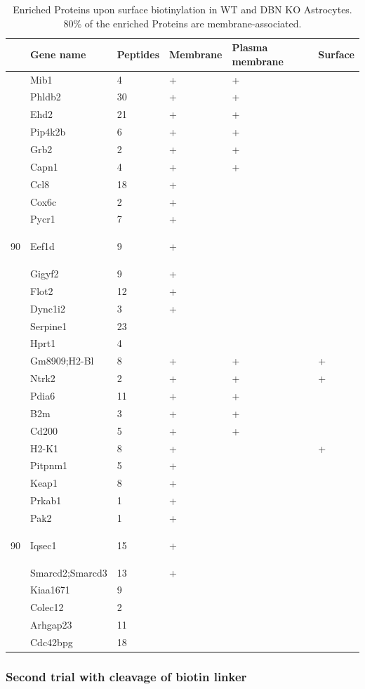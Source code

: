 \documentclass[a4paper,11pt,bibtotocnumbered]{article}
\newcommand\tabrotate[1]{\begin{turn}{90}\rlap{#1}\end{turn}} %
\begin{document}
\begin{table}[H]
\centering
\caption[Enriched Proteins upon surface biotinylation.]{Enriched Proteins upon surface biotinylation in WT and DBN KO Astrocytes. 80\% of the enriched Proteins are membrane-associated.}\label{Biotintable1}
\renewcommand{\arraystretch}{.8}
\begin{tabularx}{\textwidth}{p{.5cm}p{3cm}XXXX}
\toprule
&Gene name& Peptides & Membrane & Plasma membrane& Surface\\ 
\midrule
&Mib1&4&+&+&\\
&Phldb2 &30&+&+&\\
&Ehd2& 21&+&+&\\
&Pip4k2b&6&+&+&\\
&Grb2&2&+&+&\\
&Capn1&4&+&+&\\
&Ccl8&18&+&&\\
&Cox6c&2&+&&\\
&Pycr1&7&+&&\\
\tabrotate{WT enriched}&Eef1d&9&+&&\\
&Gigyf2&9&+&&\\
&Flot2&12&+&&\\
&Dync1i2&3&+&&\\
&Serpine1&23&&&\\
&Hprt1&4&&&\\
\midrule
&Gm8909;H2-Bl&8&+&+&+\\
&Ntrk2&2&+&+&+\\
&Pdia6&11&+&+&\\
&B2m&3&+&+&\\
&Cd200&5&+&+&\\
&H2-K1&8&+&&+\\
&Pitpnm1&5&+&&\\
&Keap1&8&+&&\\
&Prkab1&1&+&&\\
&Pak2&1&+&&\\
\tabrotate{DBN KO enriched}&Iqsec1&15&+&&\\
&Smarcd2;Smarcd3&13&+&&\\
&Kiaa1671&9&&&\\
&Colec12&2&&&\\
&Arhgap23&11&&&\\
&Cdc42bpg&18&&&\\
\bottomrule
\end{tabularx}
\end{table}


\newpage

\subsubsection{Second trial with cleavage of biotin linker}
\end{document}
